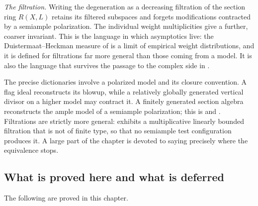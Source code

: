 \emph{The filtration.}  Writing the degeneration as a decreasing filtration
of the section ring $R(X,L)$ retains its filtered subspaces and forgets
modifications contracted by a semiample polarization.  The individual
weight multiplicities give a further, coarser invariant.  This is the
language in which asymptotics live: the
Duistermaat--Heckman measure of  is a limit of empirical
weight distributions, and it is defined for filtrations far more general
than those coming from a model.  It is also the language that survives the
passage to the complex side in .

The precise dictionaries involve a polarized model and its closure
convention.  A flag ideal reconstructs its blowup, while a relatively
globally generated vertical divisor on a higher model may contract it.
A finitely generated section algebra reconstructs the ample model of a
semiample polarization;
this is  and
.  Filtrations are strictly more general:
 exhibits a multiplicative
linearly bounded filtration that is not of finite type, so that no
semiample test configuration produces it.  A large part of the chapter is
devoted to saying precisely where the equivalence stops.

\subsection{What is proved here and what is deferred}
\label{sec:ch33-scope}

The following are proved in this chapter.

